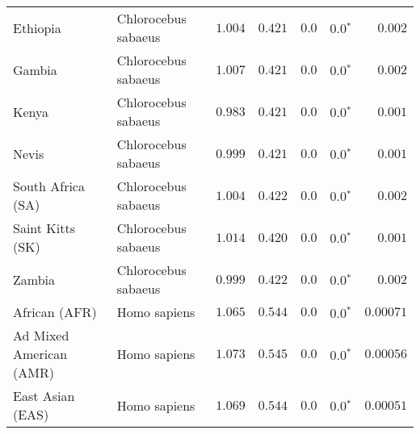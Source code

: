 \begin{center}
\begin{adjustbox}{width = 1\textwidth}
\begin{tabular}{|l|l|r|r|r|r|r|}
                       Ethiopia &  Chlorocebus sabaeus &                                           $ 1.004$ &                                           $ 0.421$ &            $0.0$ &                  $\bm{0.0{^*}}$ &           $ 0.002$ \\
                         Gambia &  Chlorocebus sabaeus &                                           $ 1.007$ &                                           $ 0.421$ &            $0.0$ &                  $\bm{0.0{^*}}$ &           $ 0.002$ \\
                          Kenya &  Chlorocebus sabaeus &                                           $ 0.983$ &                                           $ 0.421$ &            $0.0$ &                  $\bm{0.0{^*}}$ &           $ 0.001$ \\
                          Nevis &  Chlorocebus sabaeus &                                           $ 0.999$ &                                           $ 0.421$ &            $0.0$ &                  $\bm{0.0{^*}}$ &           $ 0.001$ \\
              South Africa (SA) &  Chlorocebus sabaeus &                                           $ 1.004$ &                                           $ 0.422$ &            $0.0$ &                  $\bm{0.0{^*}}$ &           $ 0.002$ \\
               Saint Kitts (SK) &  Chlorocebus sabaeus &                                           $ 1.014$ &                                           $ 0.420$ &            $0.0$ &                  $\bm{0.0{^*}}$ &           $ 0.001$ \\
                         Zambia &  Chlorocebus sabaeus &                                           $ 0.999$ &                                           $ 0.422$ &            $0.0$ &                  $\bm{0.0{^*}}$ &           $ 0.002$ \\
                  African (AFR) &         Homo sapiens &                                           $ 1.065$ &                                           $ 0.544$ &            $0.0$ &                  $\bm{0.0{^*}}$ &          $0.00071$ \\
        Ad Mixed American (AMR) &         Homo sapiens &                                           $ 1.073$ &                                           $ 0.545$ &            $0.0$ &                  $\bm{0.0{^*}}$ &          $0.00056$ \\
               East Asian (EAS) &         Homo sapiens &                                           $ 1.069$ &                                           $ 0.544$ &            $0.0$ &                  $\bm{0.0{^*}}$ &          $0.00051$ \\

\end{tabular}
\end{adjustbox}
\end{center}
